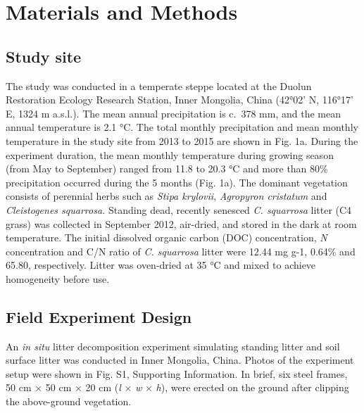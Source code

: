 \documentclass[
]{article}
\author{}
\date{\vspace{-2.5em}}
\begin{document}
\section{Materials and Methods}\label{materials-and-methods}

\subsection{Study site}\label{study-site}

The study was conducted in a temperate steppe located at the Duolun
Restoration Ecology Research Station, Inner Mongolia, China (42°02' N,
116°17' E, 1324 m a.s.l.). The mean annual precipitation is c.~378 mm,
and the mean annual temperature is 2.1 °C. The total monthly
precipitation and mean monthly temperature in the study site from 2013
to 2015 are shown in Fig. 1a. During the experiment duration, the mean
monthly temperature during growing season (from May to September) ranged
from 11.8 to 20.3 °C and more than 80\% precipitation occurred during
the 5 months (Fig. 1a). The dominant vegetation consists of perennial
herbs such as \emph{Stipa krylovii}, \emph{Agropyron cristatum} and
\emph{Cleistogenes squarrosa.} Standing dead, recently senesced \emph{C.
squarrosa} litter (C4 grass) was collected in September 2012, air-dried,
and stored in the dark at room temperature. The initial dissolved
organic carbon (DOC) concentration, \emph{N} concentration and C/N ratio
of \emph{C. squarrosa} litter were 12.44 mg g-1, 0.64\% and 65.80,
respectively. Litter was oven-dried at 35 °C and mixed to achieve
homogeneity before use.

\subsection{Field Experiment Design}\label{field-experiment-design}

An \emph{in situ} litter decomposition experiment simulating standing
litter and soil surface litter was conducted in Inner Mongolia, China.
Photos of the experiment setup were shown in Fig. S1, Supporting
Information. In brief, six steel frames, 50 cm \(\times\) 50 cm
\(\times\) 20 cm (\emph{l} \(\times\) \emph{w} \(\times\) \emph{h}),
were erected on the ground after clipping the above-ground vegetation.
\end{document}
